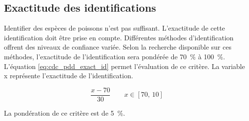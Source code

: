 

\subsection{Exactitude des identifications}
\label{s:cdc_pdd_exact_id}

Identifier des espèces de poissons n’est pas suffisant. L’exactitude de cette identification doit être prise en compte. Différentes méthodes d’identification offrent des niveaux de confiance variée. Selon la recherche disponible sur ces méthodes, l’exactitude de l’identification sera pondérée de 70~\% à 100~\%. L’équation \ref{eq:cdc_pdd_exact_id} permet l’évaluation de ce critère. La variable x représente l'exactitude de l'identification.

\begin{equation} \label{eq:cdc_pdd_exact_id}
\frac{x-70}{30} \qquad x \in [70,\,10]
\end{equation}


La pondération de ce critère est de 5~\%.

